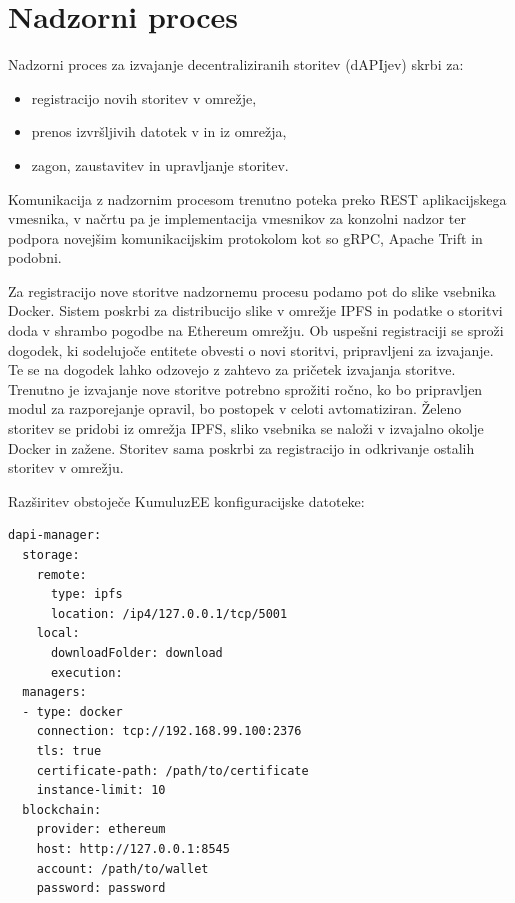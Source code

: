 \documentclass[a4paper, 12pt]{book}
\begin{document}
\section{Nadzorni proces}
Nadzorni proces za izvajanje decentraliziranih storitev (dAPIjev) skrbi za:
\begin{itemize}
	\item registracijo novih storitev v omrežje, 
	\item prenos izvršljivih datotek v in iz omrežja,
	\item zagon, zaustavitev in upravljanje storitev.
\end{itemize}

Komunikacija z nadzornim procesom trenutno poteka preko REST aplikacijskega vmesnika, v načrtu pa je implementacija vmesnikov za konzolni nadzor ter podpora novejšim komunikacijskim protokolom kot so gRPC, Apache Trift in podobni.

Za registracijo nove storitve nadzornemu procesu podamo pot do slike vsebnika Docker.
Sistem poskrbi za distribucijo slike v omrežje IPFS in podatke o storitvi doda v shrambo pogodbe na Ethereum omrežju.
Ob uspešni registraciji se sproži dogodek, ki sodelujoče entitete obvesti o novi storitvi, pripravljeni za izvajanje.
Te se na dogodek lahko odzovejo z zahtevo za pričetek izvajanja storitve.
Trenutno je izvajanje nove storitve potrebno sprožiti ročno, ko bo pripravljen modul za razporejanje opravil, bo postopek v celoti avtomatiziran.
Želeno storitev se pridobi iz omrežja IPFS, sliko vsebnika se naloži v izvajalno okolje Docker in zažene.
Storitev sama poskrbi za registracijo in odkrivanje ostalih storitev v omrežju.

Razširitev obstoječe KumuluzEE konfiguracijske datoteke:

\begin{lstlisting}
dapi-manager:
  storage:
    remote:
      type: ipfs
      location: /ip4/127.0.0.1/tcp/5001
    local:
      downloadFolder: download
      execution:
  managers:
  - type: docker
    connection: tcp://192.168.99.100:2376
    tls: true
    certificate-path: /path/to/certificate
    instance-limit: 10
  blockchain:
    provider: ethereum
    host: http://127.0.0.1:8545
    account: /path/to/wallet
    password: password
\end{lstlisting}
\end{document}
